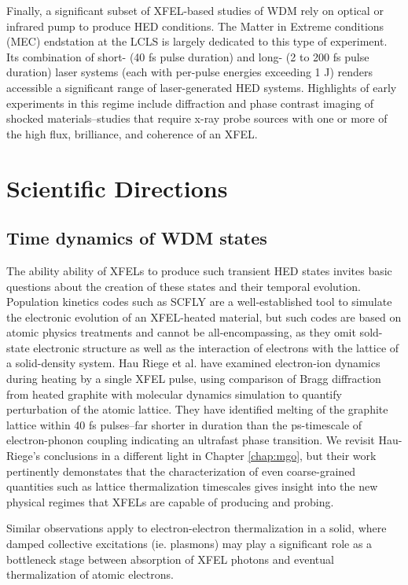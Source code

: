 \documentclass [11pt, proquest, article] {uwthesis}[2016/11/22]
\begin{document}
Finally, a significant subset of XFEL-based studies of WDM rely on optical or infrared pump to produce HED conditions. The Matter in Extreme conditions (MEC) endstation at the LCLS is largely dedicated to this type of experiment. Its combination of short- (40 fs pulse duration) and long- (2 to 200 fs pulse duration) laser systems (each with per-pulse energies exceeding 1 J) renders accessible a significant range of laser-generated HED systems. Highlights of early experiments in this regime include diffraction and phase contrast imaging of shocked materials--studies that require x-ray probe sources with one or more of the  high flux, brilliance, and coherence of an XFEL.  


\section{Scientific Directions}
\subsection{Time dynamics of WDM states}
The ability ability of XFELs to produce such transient HED states invites basic questions about the creation of these states and their temporal evolution. Population kinetics codes such as SCFLY are a well-established tool to simulate the electronic evolution of an XFEL-heated material, but such codes are based on atomic physics treatments and cannot be all-encompassing, as they omit sold-state electronic structure as well as the interaction of electrons with the lattice of a solid-density system.  Hau Riege et al. have examined electron-ion dynamics during heating by a single XFEL pulse, using comparison of Bragg diffraction from heated graphite with molecular dynamics simulation to quantify perturbation of the atomic lattice. They have identified melting of the graphite lattice within 40 fs pulses--far shorter in duration than the ps-timescale of electron-phonon coupling indicating an ultrafast phase transition. We revisit Hau-Riege's conclusions in a different light in Chapter \ref{chap:mgo}, but their work pertinently demonstates that the characterization of even coarse-grained quantities such as lattice thermalization timescales gives insight into the new physical regimes that XFELs are capable of producing and probing. 

Similar observations apply to electron-electron thermalization in a solid, where damped collective excitations (ie. plasmons) may play a significant role as a bottleneck stage between absorption of XFEL photons and eventual thermalization of atomic electrons.\cite{egerton1979k, sorini2006ab}%
\end{document}
